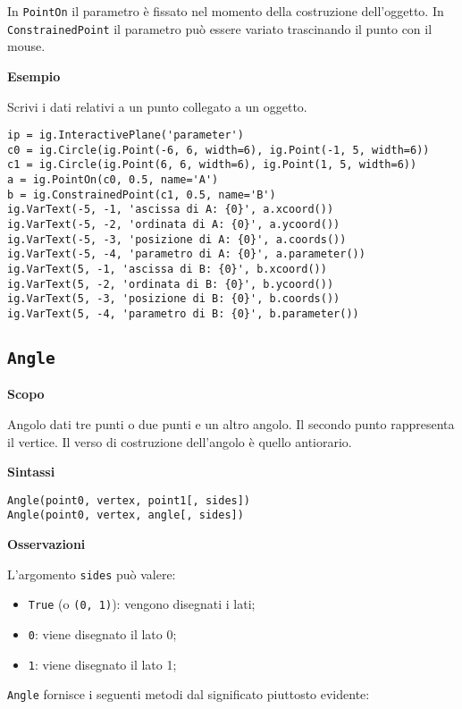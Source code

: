 In \texttt{PointOn} il parametro è fissato nel momento della costruzione
dell'oggetto. In \texttt{ConstrainedPoint} il parametro può essere variato
trascinando il punto con il mouse.

\textbf{Esempio}

Scrivi i dati relativi a un punto collegato a un oggetto.

\begin{lstlisting}
ip = ig.InteractivePlane('parameter')
c0 = ig.Circle(ig.Point(-6, 6, width=6), ig.Point(-1, 5, width=6))
c1 = ig.Circle(ig.Point(6, 6, width=6), ig.Point(1, 5, width=6))
a = ig.PointOn(c0, 0.5, name='A')
b = ig.ConstrainedPoint(c1, 0.5, name='B')
ig.VarText(-5, -1, 'ascissa di A: {0}', a.xcoord())
ig.VarText(-5, -2, 'ordinata di A: {0}', a.ycoord())
ig.VarText(-5, -3, 'posizione di A: {0}', a.coords())
ig.VarText(-5, -4, 'parametro di A: {0}', a.parameter())
ig.VarText(5, -1, 'ascissa di B: {0}', b.xcoord())
ig.VarText(5, -2, 'ordinata di B: {0}', b.ycoord())
ig.VarText(5, -3, 'posizione di B: {0}', b.coords())
ig.VarText(5, -4, 'parametro di B: {0}', b.parameter())
\end{lstlisting}


\subsection{\texttt{Angle}}
\label{sub:geoint_angle}
\textbf{Scopo}

Angolo dati tre punti o due punti e un altro angolo.
Il secondo punto rappresenta il vertice. Il verso di costruzione dell'angolo
è quello antiorario.

\textbf{Sintassi}

\begin{lstlisting}
Angle(point0, vertex, point1[, sides])
Angle(point0, vertex, angle[, sides])
\end{lstlisting}

\textbf{Osservazioni}

L'argomento \texttt{sides} può valere:

\begin{itemize} [noitemsep]
\item \texttt{True} (o \texttt{(0, 1)}): vengono disegnati i lati;
\item \texttt{0}: viene disegnato il lato 0;
\item \texttt{1}: viene disegnato il lato 1;
\end{itemize}

\texttt{Angle} fornisce i seguenti metodi dal significato piuttosto evidente:


